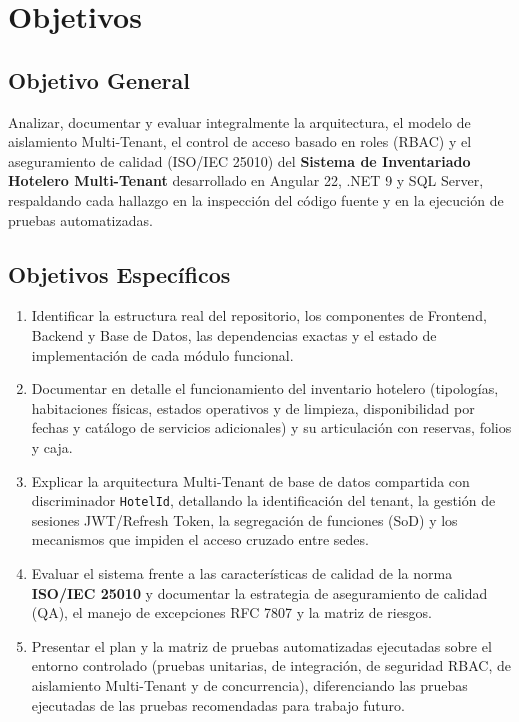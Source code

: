 \documentclass[12pt,a4paper]{article}
\begin{document}
\section{Objetivos}

\subsection{Objetivo General}
Analizar, documentar y evaluar integralmente la arquitectura, el modelo de aislamiento Multi-Tenant, el control de acceso basado en roles (RBAC) y el aseguramiento de calidad (ISO/IEC 25010) del \textbf{Sistema de Inventariado Hotelero Multi-Tenant} desarrollado en Angular 22, .NET 9 y SQL Server, respaldando cada hallazgo en la inspecci\'on del c\'odigo fuente y en la ejecuci\'on de pruebas automatizadas.

\subsection{Objetivos Espec\'ificos}
\begin{enumerate}
    \item Identificar la estructura real del repositorio, los componentes de Frontend, Backend y Base de Datos, las dependencias exactas y el estado de implementaci\'on de cada m\'odulo funcional.
    \item Documentar en detalle el funcionamiento del inventario hotelero (tipolog\'ias, habitaciones f\'isicas, estados operativos y de limpieza, disponibilidad por fechas y cat\'alogo de servicios adicionales) y su articulaci\'on con reservas, folios y caja.
    \item Explicar la arquitectura Multi-Tenant de base de datos compartida con discriminador \texttt{HotelId}, detallando la identificaci\'on del tenant, la gesti\'on de sesiones JWT/Refresh Token, la segregaci\'on de funciones (SoD) y los mecanismos que impiden el acceso cruzado entre sedes.
    \item Evaluar el sistema frente a las caracter\'isticas de calidad de la norma \textbf{ISO/IEC 25010} y documentar la estrategia de aseguramiento de calidad (QA), el manejo de excepciones RFC 7807 y la matriz de riesgos.
    \item Presentar el plan y la matriz de pruebas automatizadas ejecutadas sobre el entorno controlado (pruebas unitarias, de integraci\'on, de seguridad RBAC, de aislamiento Multi-Tenant y de concurrencia), diferenciando las pruebas ejecutadas de las pruebas recomendadas para trabajo futuro.
\end{enumerate}
\end{document}
